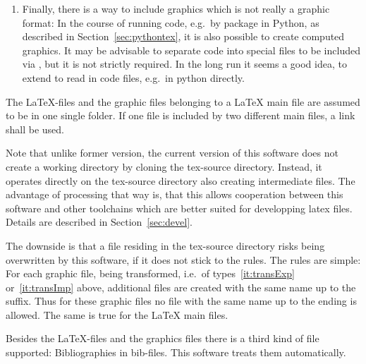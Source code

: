 \begin{enumerate}
the fourth kind of graphics formats 
has to be transformed into one of the kinds one or two 
but unlike in type three, this is not done explicitly 
by an external tool but by a latex-package during the \LaTeX-run. 
Note that, although not required to be explicitly transformed, 
those graphics files induce additional files 
by running \LaTeX.
Essentially, each of the abovementioned type of format
can be included that way but currently,
this is done for the \gls{svg}-format only
included by the package  (see~\cite{SvgP}).
The author personally refrains from using packages like that
because of the lack of flexibility and further drawbacks. 
\item 
Finally, there is a way to include graphics which is not really a graphic format: 
In the course of running code, e.g.~by package  in Python, 
as described in Section~\ref{sec:pythontex}, 
it is also possible to create computed graphics. 
It may be advisable to separate code into special files to be included via , 
but it is not strictly required. 
In the long run it seems a good idea, to extend  
to read in code files, e.g.~in python directly. 
\end{enumerate}

The \LaTeX-files and the graphic files belonging to a \LaTeX{} main file 
are assumed to be in one single folder. 
If one file is included by two different main files, 
a link shall be used.

Note that unlike former version, 
the current version of this software does not create a working directory 
by cloning the tex-source directory. 
Instead, it operates directly on the tex-source directory 
also creating intermediate files.
The advantage of processing that way is,
that this allows cooperation between this software
and other toolchains which are better suited for developping latex files.
Details are described in Section~\ref{sec:devel}.

The downside is that a file residing in the tex-source directory 
risks being overwritten by this software, 
if it does not stick to the rules. 
The rules are simple: 
For each graphic file, being transformed, 
i.e.~of types~\ref{it:transExp} or~\ref{it:transImp} above, 
additional files are created with the same name up to the suffix. 
Thus for these graphic files no file with the same name 
up to the ending is allowed. 
The same is true for the \LaTeX{} main files.

Besides the \LaTeX-files and the graphics files
there is a third kind of file supported:
Bibliographies in bib-files.
This software treats them automatically. 


